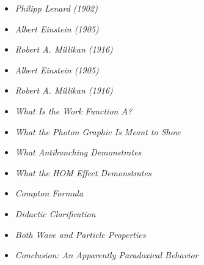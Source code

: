 \vspace{1em}
\begin{tcolorbox}[title=Physical Boxes,physikbox]
	\begin{itemize}
		\item \emph{Philipp Lenard (1902)} \dotfill\pageref{box:Philipp Lenhard}
		\item \emph{Albert Einstein (1905)} \dotfill\pageref{die Erzeuguung von Licht}
		\item \emph{Robert A. Millikan (1916)} \dotfill\pageref{box:Robert A, Millikan}
		\item \emph{Albert Einstein (1905)} \dotfill\pageref{die Erscheinung der Wärm}
		\item \emph{Robert A. Millikan (1916)} \dotfill\pageref{box:einsteins gleichung passt}
		\item \emph{What Is the Work Function \( A \)?} \dotfill\pageref{bos:was ist Austrittsarbeit}
		\item \emph{What the Photon Graphic Is Meant to Show} \dotfill\pageref{box:was die photonengrafik}
		\item \emph{What Antibunching Demonstrates} \dotfill\pageref{box:wasAntibunching}
		\item \emph{What the HOM Effect Demonstrates} \dotfill\pageref{box:HOM-Effekt}
	\end{itemize}
\end{tcolorbox}

\vspace{1em}
\begin{tcolorbox}[title=Mathematical Boxes,mathebox]
	\begin{itemize}
		\item \emph{Compton Formula} \dotfill\pageref{box:comptonFormel}
	\end{itemize}
\end{tcolorbox}

\vspace{1em}
\begin{tcolorbox}[title=Didactic Boxes,didaktikbox]
	\begin{itemize}
		\item \emph{Didactic Clarification} \dotfill\pageref{box:didaktischeKlarstellung}
		\item \emph{Both Wave and Particle Properties} \dotfill\pageref{box:wellen}
		\item \emph{Conclusion: An Apparently Paradoxical Behavior} \dotfill\pageref{box:Fazit ein scheinbarer}
	\end{itemize}
\end{tcolorbox}

